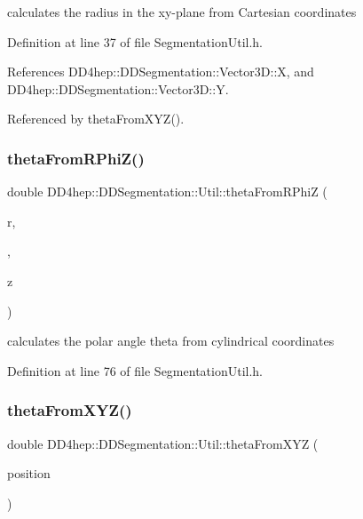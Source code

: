 calculates the radius in the xy-\/plane from Cartesian coordinates 



Definition at line 37 of file Segmentation\+Util.\+h.



References D\+D4hep\+::\+D\+D\+Segmentation\+::\+Vector3\+D\+::X, and D\+D4hep\+::\+D\+D\+Segmentation\+::\+Vector3\+D\+::Y.



Referenced by theta\+From\+X\+Y\+Z().

\hypertarget{namespace_d_d4hep_1_1_d_d_segmentation_1_1_util_a810a2371a6bb37d88321f100026f35c3}{}\label{namespace_d_d4hep_1_1_d_d_segmentation_1_1_util_a810a2371a6bb37d88321f100026f35c3} 
\subsubsection{\texorpdfstring{theta\+From\+R\+Phi\+Z()}{thetaFromRPhiZ()}}
{\footnotesize\ttfamily double D\+D4hep\+::\+D\+D\+Segmentation\+::\+Util\+::theta\+From\+R\+PhiZ (\begin{DoxyParamCaption}\item[{double}]{r,  }\item[{double}]{,  }\item[{double}]{z }\end{DoxyParamCaption})}



calculates the polar angle theta from cylindrical coordinates 



Definition at line 76 of file Segmentation\+Util.\+h.

\hypertarget{namespace_d_d4hep_1_1_d_d_segmentation_1_1_util_a91c9acb845023538b301430609481e0e}{}\label{namespace_d_d4hep_1_1_d_d_segmentation_1_1_util_a91c9acb845023538b301430609481e0e} 
\subsubsection{\texorpdfstring{theta\+From\+X\+Y\+Z()}{thetaFromXYZ()}}
{\footnotesize\ttfamily double D\+D4hep\+::\+D\+D\+Segmentation\+::\+Util\+::theta\+From\+X\+YZ (\begin{DoxyParamCaption}\item[{const \hyperlink{struct_d_d4hep_1_1_d_d_segmentation_1_1_vector3_d}{Vector3D} \&}]{position }\end{DoxyParamCaption})}



